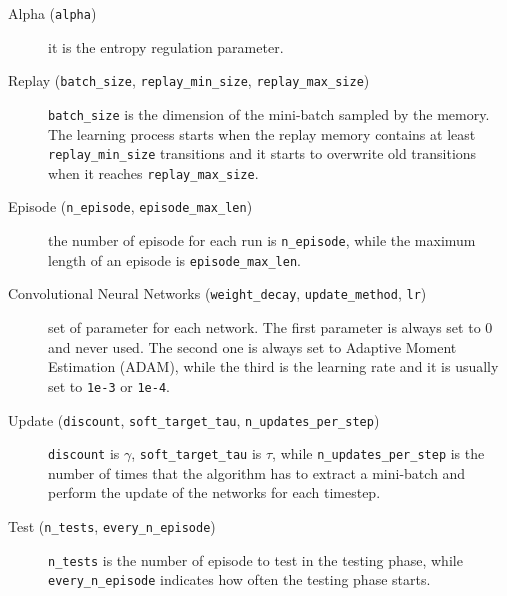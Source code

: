 \documentclass[a4paper, 11pt]{article}
\begin{document}
	\begin{description}
		\item[Alpha (\texttt{alpha})] it is the entropy regulation parameter.
		
		
		
		\item[Replay (\texttt{batch\_size}, \texttt{replay\_min\_size}, \texttt{replay\_max\_size})] \texttt{batch\_size} is the dimension of the mini-batch sampled by the memory. The learning process starts when the replay memory contains at least \texttt{replay\_min\_size} transitions and it starts to overwrite old transitions when it reaches \texttt{replay\_max\_size}.
		
		
		\item[Episode (\texttt{n\_episode}, \texttt{episode\_max\_len})] the number of episode for each run is \texttt{n\_episode}, while the maximum length of an episode is \texttt{episode\_max\_len}.
		
		
		\item[Convolutional Neural Networks (\texttt{weight\_decay}, \texttt{update\_method}, \texttt{lr})] set of parameter for each network. The first parameter is always set to 0 and never used. The second one is always set to Adaptive Moment Estimation (ADAM), while the third is the learning rate and it is usually set to \texttt{1e-3} or \texttt{1e-4}.
		
		
		\item[Update (\texttt{discount}, \texttt{soft\_target\_tau}, \texttt{n\_updates\_per\_step})] \texttt{discount} is $\gamma$, \texttt{soft\_target\_tau} is $\tau$, while \texttt{n\_updates\_per\_step} is the number of times that the algorithm has to extract a mini-batch and perform the update of the networks for each timestep.
		
		
		\item[Test (\texttt{n\_tests}, \texttt{every\_n\_episode})] \texttt{n\_tests} is the number of episode to test in the testing phase, while \texttt{every\_n\_episode} indicates how often the testing phase starts. 
		
		
		
	\end{description}
\end{document}
